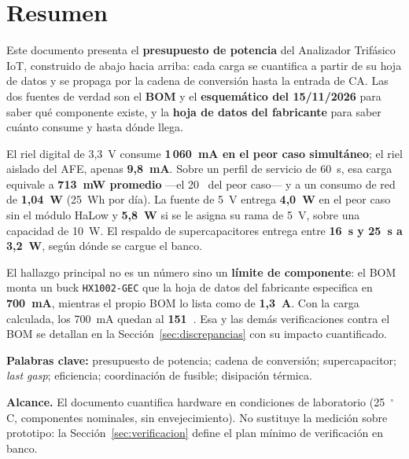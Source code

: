 \documentclass[11pt,a4paper]{article}
\newcommand{\pct}{\text{\char37}}
\begin{document}
\setcounter{page}{1}

\section*{Resumen}

Este documento presenta el \textbf{presupuesto de potencia} del Analizador
Trifásico IoT, construido de abajo hacia arriba: cada carga se cuantifica a
partir de su hoja de datos y se propaga por la cadena de conversión hasta la
entrada de CA. Las dos fuentes de verdad son el \textbf{BOM} y el
\textbf{esquemático del 15/11/2026} para saber qué componente existe, y la
\textbf{hoja de datos del fabricante} para saber cuánto consume y hasta dónde
llega.

El riel digital de 3,3~V consume \textbf{1\,060~mA en el peor caso simultáneo};
el riel aislado del AFE, apenas \textbf{9,8~mA}. Sobre un perfil de servicio de
60~s, esa carga equivale a \textbf{713~mW promedio} ---el 20~\pct{} del peor
caso--- y a un consumo de red de \textbf{1,04~W} (25~Wh por día). La fuente de
5~V entrega \textbf{4,0~W} en el peor caso sin el módulo HaLow y \textbf{5,8~W}
si se le asigna su rama de 5~V, sobre una capacidad de 10~W. El respaldo de
supercapacitores entrega entre \textbf{16~s y 25~s a 3,2~W}, según dónde se
cargue el banco.

El hallazgo principal no es un número sino un \textbf{límite de componente}: el
BOM monta un buck \texttt{HX1002-GEC} que la hoja de datos del fabricante
especifica en \textbf{700~mA}, mientras el propio BOM lo lista como de
\textbf{1,3~A}. Con la carga calculada, los 700~mA quedan al \textbf{151~\pct}.
Esa y las demás verificaciones contra el BOM se detallan en la
Sección~\ref{sec:discrepancias} con su impacto cuantificado.

\vspace{0.4em}
\noindent\textbf{Palabras clave:} presupuesto de potencia; cadena de conversión;
supercapacitor; \emph{last gasp}; eficiencia; coordinación de fusible;
disipación térmica.

\vspace{0.6em}
\noindent\textbf{Alcance.} El documento cuantifica hardware en condiciones de
laboratorio (25~$^\circ$C, componentes nominales, sin envejecimiento). No
sustituye la medición sobre prototipo: la Sección~\ref{sec:verificacion} define
el plan mínimo de verificación en banco.
\end{document}
